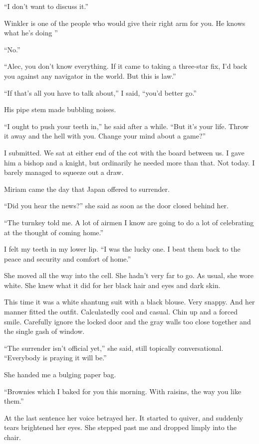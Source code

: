 \documentclass{novel}
\begin{document}
“I don’t want to discuss it.”

Winkler is one of the people who would give their right arm for you. He knows what he’s doing ”

“No.”

“Alec, you don’t know everything. If it came to taking a three-star fix, I’d back you against any navigator in the world. But this is law.”

“If that’s all you have to talk about,” I said, “you’d better go.”

His pipe stem made bubbling noises.

“I ought to push your teeth in,” he said after a while. “But it’s your life. Throw it away and the hell with you. Change your mind about a game?”

I submitted. We sat at either end of the cot with the board between us. I gave him a bishop and a knight, but ordinarily he needed more than that. Not today. I barely managed to squeeze out a draw.

\scenestars

Miriam came the day that Japan offered to surrender.

“Did you hear the news?” she said as soon as the door closed behind her.

“The turnkey told me. A lot of airmen I know are going to do a lot of celebrating at the thought of coming home.” 

I felt my teeth in my lower lip. “I was the lucky one. I beat them back to the peace and security and comfort of home.”

She moved all the way into the cell. She hadn’t very far to go. As usual, she wore white. She knew what it did for her black hair and eyes and dark skin.

This time it was a white shantung suit with a black blouse. Very snappy. And her manner fitted the outfit. Calculatedly cool and casual. Chin up and a forced smile. Carefully ignore the locked door and the gray walls too close together and the single gash of window.

“The surrender isn’t official yet,” she said, still topically conversational. “Everybody is praying it will be.” 

She handed me a bulging paper bag. 

“Brownies which I baked for you this morning. With raisins, the way you like them.”

At the last sentence her voice betrayed her. It started to quiver, and suddenly tears brightened her eyes. She stepped past me and dropped limply into the chair.
\end{document}

